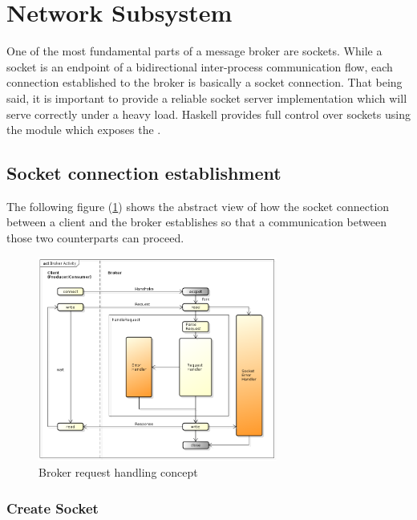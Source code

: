 \section{Network Subsystem}

One of the most fundamental parts of a message broker are sockets. While a
socket is an endpoint of a bidirectional inter-process communication flow, each
connection established to the broker is basically a socket connection. That
being said, it is important to provide a reliable socket server implementation
which will serve correctly under a heavy load. Haskell provides full control
over sockets using the
module which exposes the .

\subsection{Socket connection establishment}

The following figure (\ref{fig:broker-activity}) shows the abstract view of how
the socket connection between a client and the broker establishes so that a
communication between those two counterparts can proceed.

\begin{figure}[H]
    \centering
    \includegraphics[width=0.7\textwidth]{images/broker-activity.png}
    \caption{Broker request handling concept}
    \label{fig:broker-activity}
\end{figure}

\subsubsection{Create Socket}

